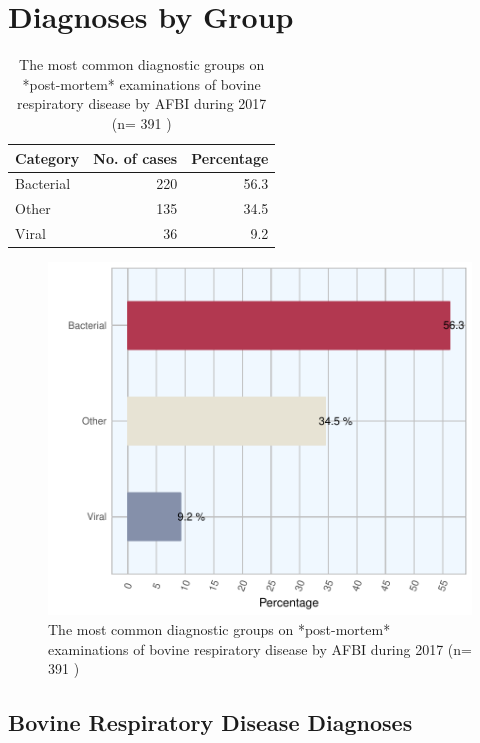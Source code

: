 \documentclass[]{book}
\begin{document}
\section{Diagnoses by Group}\label{diagnoses-by-group}

\begin{table}

\caption{\label{tab:unnamed-chunk-21}The most common diagnostic groups on *post-mortem* examinations of bovine respiratory disease by AFBI during 2017 (n= 391 )}
\centering
\begin{tabular}[t]{l|r|r}
\hline
Category & No. of cases & Percentage\\
\hline
Bacterial & 220 & 56.3\\
\hline
Other & 135 & 34.5\\
\hline
Viral & 36 & 9.2\\
\hline
\end{tabular}
\end{table}

\begin{figure}

{\centering \includegraphics{AFBI_files/figure-latex/unnamed-chunk-22-1} 

}

\caption{The most common diagnostic groups on *post-mortem* examinations of bovine respiratory disease by AFBI during 2017 (n= 391 )}\label{fig:unnamed-chunk-22}
\end{figure}

\subsection{Bovine Respiratory Disease
Diagnoses}\label{bovine-respiratory-disease-diagnoses}
\end{document}
